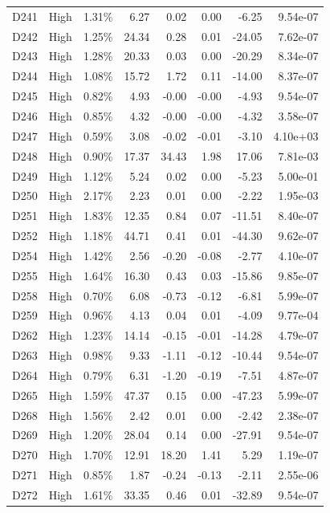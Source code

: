 \begin{tabular}{l l r r r r r r}
D241 & High & 1.31\% & 6.27 & 0.02 & 0.00 & -6.25 & 9.54e-07 \\
D242 & High & 1.25\% & 24.34 & 0.28 & 0.01 & -24.05 & 7.62e-07 \\
D243 & High & 1.28\% & 20.33 & 0.03 & 0.00 & -20.29 & 8.34e-07 \\
D244 & High & 1.08\% & 15.72 & 1.72 & 0.11 & -14.00 & 8.37e-07 \\
D245 & High & 0.82\% & 4.93 & -0.00 & -0.00 & -4.93 & 9.54e-07 \\
D246 & High & 0.85\% & 4.32 & -0.00 & -0.00 & -4.32 & 3.58e-07 \\
D247 & High & 0.59\% & 3.08 & -0.02 & -0.01 & -3.10 & 4.10e+03 \\
D248 & High & 0.90\% & 17.37 & 34.43 & 1.98 & 17.06 & 7.81e-03 \\
D249 & High & 1.12\% & 5.24 & 0.02 & 0.00 & -5.23 & 5.00e-01 \\
D250 & High & 2.17\% & 2.23 & 0.01 & 0.00 & -2.22 & 1.95e-03 \\
D251 & High & 1.83\% & 12.35 & 0.84 & 0.07 & -11.51 & 8.40e-07 \\
D252 & High & 1.18\% & 44.71 & 0.41 & 0.01 & -44.30 & 9.62e-07 \\
D254 & High & 1.42\% & 2.56 & -0.20 & -0.08 & -2.77 & 4.10e-07 \\
D255 & High & 1.64\% & 16.30 & 0.43 & 0.03 & -15.86 & 9.85e-07 \\
D258 & High & 0.70\% & 6.08 & -0.73 & -0.12 & -6.81 & 5.99e-07 \\
D259 & High & 0.96\% & 4.13 & 0.04 & 0.01 & -4.09 & 9.77e-04 \\
D262 & High & 1.23\% & 14.14 & -0.15 & -0.01 & -14.28 & 4.79e-07 \\
D263 & High & 0.98\% & 9.33 & -1.11 & -0.12 & -10.44 & 9.54e-07 \\
D264 & High & 0.79\% & 6.31 & -1.20 & -0.19 & -7.51 & 4.87e-07 \\
D265 & High & 1.59\% & 47.37 & 0.15 & 0.00 & -47.23 & 5.99e-07 \\
D268 & High & 1.56\% & 2.42 & 0.01 & 0.00 & -2.42 & 2.38e-07 \\
D269 & High & 1.20\% & 28.04 & 0.14 & 0.00 & -27.91 & 9.54e-07 \\
D270 & High & 1.70\% & 12.91 & 18.20 & 1.41 & 5.29 & 1.19e-07 \\
D271 & High & 0.85\% & 1.87 & -0.24 & -0.13 & -2.11 & 2.55e-06 \\
D272 & High & 1.61\% & 33.35 & 0.46 & 0.01 & -32.89 & 9.54e-07 \\

\end{tabular}

